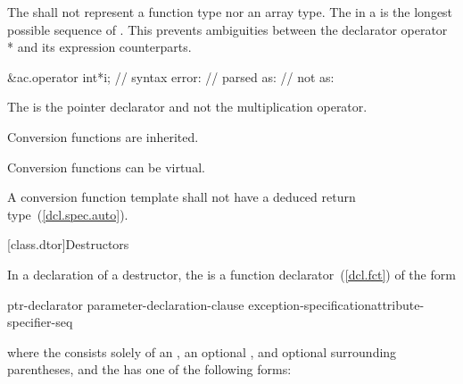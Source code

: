 \pnum
The
shall not represent a function type nor an array type.
The
in a
is the longest possible sequence of
.
\enternote
This prevents ambiguities between the declarator operator * and its expression
counterparts.
\enterexample

\begin{codeblock}
&ac.operator int*i; // syntax error:
                    // parsed as: 
                    // not as: 
\end{codeblock}

The \tcode{*} is the pointer declarator and not the multiplication operator.
\exitexample
\exitnote

\pnum
{}%
Conversion functions are inherited.

\pnum
{}%
Conversion functions can be virtual.

\pnum
{}%
A conversion function template shall not have a
deduced return type~(\ref{dcl.spec.auto}).

[class.dtor]{Destructors}%

\pnum
In a declaration of a destructor, the  is a
function declarator~(\ref{dcl.fct}) of the form

\begin{ncbnf}
ptr-declarator \terminal{(} parameter-declaration-clause \terminal{)} exception-specification\opt attribute-specifier-seq\opt
\end{ncbnf}

where the  consists solely of an
, an optional ,
and optional surrounding parentheses, and the  has
one of the following forms:

